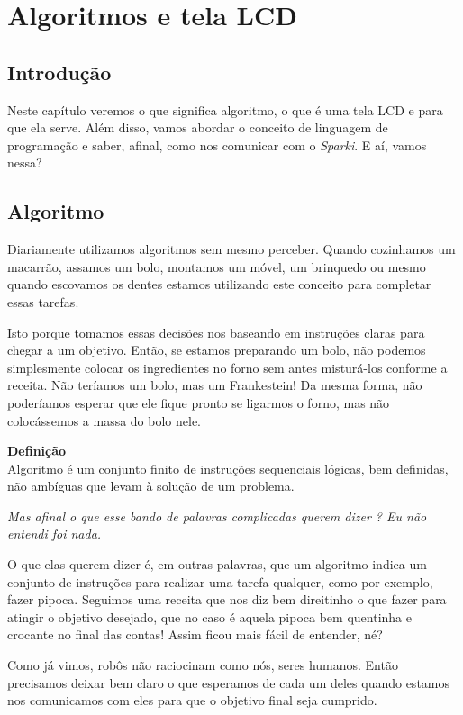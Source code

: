 \chapter{Algoritmos e tela LCD}
\section*{Introdução}
    Neste capítulo veremos o que significa algoritmo, o que é uma tela LCD e para que ela serve. Além disso, vamos abordar o conceito de linguagem de programação e saber, afinal, como nos comunicar com o \textit{Sparki}. E aí, vamos nessa?
\section{Algoritmo}
    Diariamente utilizamos algoritmos sem mesmo perceber. Quando cozinhamos um macarrão, assamos um bolo, montamos um móvel, um brinquedo ou mesmo quando escovamos os dentes estamos utilizando este conceito para completar essas tarefas. \par
    Isto porque tomamos essas decisões nos baseando em instruções claras para chegar a um objetivo. Então, se estamos preparando um bolo, não podemos simplesmente colocar os ingredientes no forno sem antes misturá-los conforme a receita. Não teríamos um bolo, mas um Frankestein! Da mesma forma, não poderíamos esperar que ele fique pronto se ligarmos o forno, mas não colocássemos a massa do bolo nele. \par
    \begin{center}
    \textbf{Definição} \\
    Algoritmo é um conjunto finito de instruções sequenciais lógicas, bem definidas, não ambíguas que levam à solução de um problema.
    \end{center}
    \textit{Mas afinal o que esse bando de palavras complicadas querem dizer ? Eu não entendi foi nada.}
    
    O que elas querem dizer é, em outras palavras, que um algoritmo indica um conjunto de instruções para realizar uma tarefa qualquer, como por exemplo, fazer pipoca. Seguimos uma receita que nos diz bem direitinho o que fazer para atingir o objetivo desejado, que no caso é aquela pipoca bem quentinha e crocante no final das contas! Assim ficou mais fácil de entender, né? \par
    Como já vimos, robôs não raciocinam como nós, seres humanos. Então precisamos deixar bem claro o que esperamos de cada um deles quando estamos nos comunicamos com eles para que o objetivo final seja cumprido. 
    
